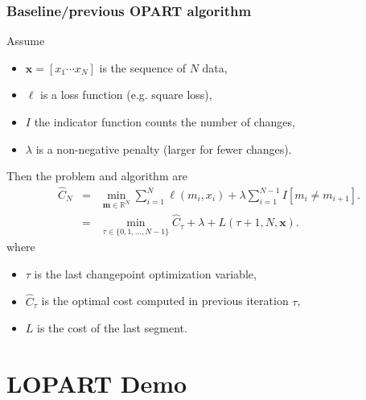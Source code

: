 \documentclass{beamer}
\begin{document}
\begin{frame}
  \frametitle{Baseline/previous OPART algorithm}

  Assume
  \begin{itemize}
  \item $\mathbf x = [ x_1 \cdots x_N ]$ is the sequence of $N$ data,
  \item $\ell$ is a loss function (e.g. square loss),
  \item $I$ the indicator function counts the number of changes,
  \item $\lambda$ is a non-negative penalty (larger for fewer changes).
  \end{itemize}
  Then the problem and algorithm are
  \begin{eqnarray*}
    \label{eq:op}
    \hat C_N &=& \min_{\mathbf m\in \mathbb R^N}
                 \sum_{i=1}^N \ell(m_i, x_i) + 
                 \lambda \sum_{i=1}^{N-1} I[m_i \neq m_{i+1}].\\
             &=& \min_{\tau\in \{0, 1, \dots, N-1\} }
                 \hat C_\tau +
                 \lambda +
                 L(\tau+1, N, \mathbf x).
                 \label{eq:op-update}
  \end{eqnarray*}
  where
  \begin{itemize}
  \item $\tau$ is the last changepoint optimization variable,
  \item $\hat C_\tau$ is the optimal cost computed in previous iteration $\tau$,
  \item $L$ is the cost of the last segment.
  \end{itemize}

\end{frame}

\section{LOPART Demo}

\newcommand\Wider[2][3cm]{%
\makebox[\linewidth][c]{%
  \begin{minipage}{\dimexpr\textwidth+#1\relax}
  \raggedright#2
  \end{minipage}%
  }%
}


\end{document}
